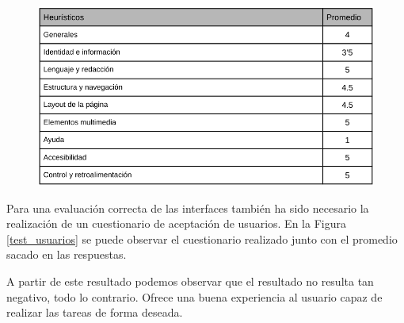 \documentclass[pdftex,11pt,a4paper]{book}
\begin{document}
\begin{figure}[h]
\begin{center}
\includegraphics[width=\textwidth]{img/heuristico13}
\caption{\label{heuristico13}}
\end{center}
\end{figure}

Para una evaluación correcta de las interfaces también ha sido necesario la realización de un cuestionario de aceptación de usuarios. En la Figura \ref{test_usuarios} se puede observar el cuestionario realizado junto con el promedio sacado en las respuestas.

A partir de este resultado podemos observar que el resultado no resulta tan negativo, todo lo contrario. Ofrece una buena experiencia al usuario capaz de realizar las tareas de forma deseada.
\end{document}
